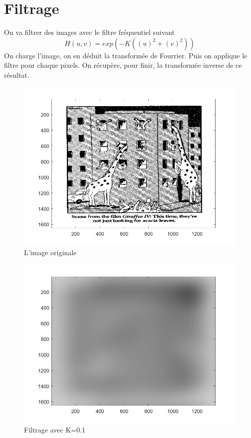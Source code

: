 \documentclass[10pt,a4paper]{article}
\begin{document}
\section{Filtrage}

On va filtrer des images avec le filtre fréquentiel suivant
\[
	H(u,v) = exp(-K((u)^2+(v)^2))
\]
On charge l'image, on en déduit la transformée de Fourrier. Puis on applique le filtre pour chaque pixels. On récupère, pour finir, la transformée inverse de ce résultat.

\begin{figure}[H]	\begin{center}
\includegraphics[scale=0.35]{girafe_originale.png}
\caption{L'image originale}
\label{XX}
\end{center}	\end{figure}



\begin{figure}[H]	\begin{center}
\includegraphics[scale=0.35]{imfiltree_k=0.1.jpg}
\caption{Filtrage avec K=0.1}
\label{XX}
\end{center}	\end{figure}
\end{document}
